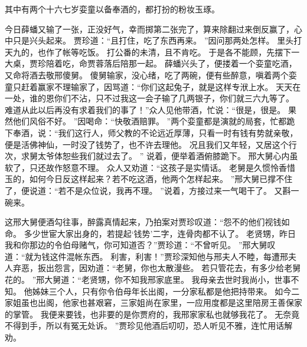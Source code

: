 其中有两个十六七岁娈童以备奉酒的，都打扮的粉妆玉琢。
\par
今日薛蟠又输了一张，正没好气，幸而掷第二张完了，算来除翻过来倒反赢了，心中只是兴头起来。
贾珍道：“且打住，吃了东西再来。
”因问那两处怎样。
里头打天九的，也作了帐等吃饭。
打公番的未清，且不肯吃。
于是各不能顾，先摆下一大桌，贾珍陪着吃，命贾蓉落后陪那一起。
薛蟠兴头了，便搂着一个娈童吃酒，又命将酒去敬邢傻舅。
傻舅输家，没心绪，吃了两碗，便有些醉意，嗔着两个娈童只赶着赢家不理输家了，因骂道：“你们这起兔子，就是这样专洑上水。
天天在一处，谁的恩你们不沾，只不过我这一会子输了几两银子，你们就三六九等了。
难道从此以后再没有求着我们的事了！”众人见他带酒，忙说：“很是，很是。
果然他们风俗不好。
”因喝命：“快敬酒赔罪。
”两个娈童都是演就的局套，忙都跪下奉酒，说：“我们这行人，师父教的不论远近厚薄，只看一时有钱有势就亲敬，便是活佛神仙，一时没了钱势了，也不许去理他。
况且我们又年轻，又居这个行次，求舅太爷体恕些我们就过去了。
”
  说着，便举着酒俯膝跪下。
邢大舅心内虽软了，只还故作怒意不理。
众人又劝道：“这孩子是实情话。
老舅是久惯怜香惜玉的，如何今日反这样起来？若不吃这酒，他两个怎样起来。
”邢大舅已撑不住了，便说道：“若不是众位说，我再不理。
”说着，方接过来一气喝干了。
又斟一碗来。
\par
这邢大舅便酒勾往事，醉露真情起来，乃拍案对贾珍叹道：“怨不的他们视钱如命。
多少世宦大家出身的，若提起‘钱势’二字，连骨肉都不认了。
老贤甥，昨日我和你那边的令伯母赌气，你可知道否？”贾珍道：“不曾听见。
”邢大舅叹道：“就为钱这件混帐东西。
利害，利害！”贾珍深知他与邢夫人不睦，每遭邢夫人弃恶，扳出怨言，因劝道：“老舅，你也太散漫些。
若只管花去，有多少给老舅花的。
”邢大舅道：“老贤甥，你不知我邢家底里。
我母亲去世时我尚小，世事不知。
他姊妹三个人，只有你令伯母年长出阁，一分家私都是他把持带来。
如今二家姐虽也出阁，他家也甚艰窘，三家姐尚在家里，一应用度都是这里陪房王善保家的掌管。
我便来要钱，也非要的是你贾府的，我邢家家私也就够我花了。
无奈竟不得到手，所以有冤无处诉。
”贾珍见他酒后叨叨，恐人听见不雅，连忙用话解劝。
